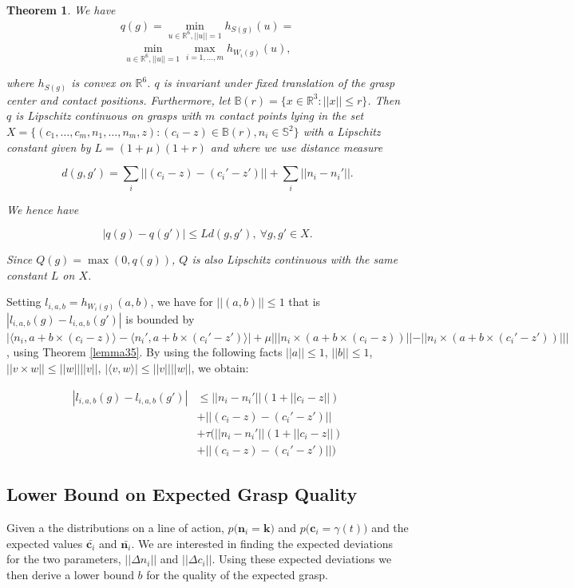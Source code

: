 \documentclass[letterpaper, 10 pt, conference]{ieeeconf}  %
\newtheorem{theorem}{Theorem}
\begin{document}
\begin{theorem}
  \cite{pokorny2013classical}
We have \\

\begin{align}
q(g) 
=
\min_{u\in \mathbb{R}^6, ||u|| =1} h_{S(g)}(u) 
=
\end{align}
\[
\min_{u\in \mathbb{R}^6, ||u|| =1} \max_{i=1,...,m} h_{W_i(g)}(u),
\]

where $h_{S(g)}$ is convex on $\mathbb{R}^6$.
$q$ is invariant under fixed translation of the grasp center and contact positions.
Furthermore, let $\mathbb{B}(r) = \lbrace x \in \mathbb{R}^3 : ||x|| \leq r \rbrace$.
Then $q$ is Lipschitz continuous on grasps with $m$ contact points lying in the set $X = \lbrace (c_1, \dots, c_m,n_1, \dots,n_m,z) : (c_i-z) \in \mathbb{B}(r), n_i \in \mathbb{S}^2 \rbrace$ with a Lipschitz constant given by $L= (1+\mu)(1+r)$ and where we use distance measure 

\[
  d(g,g') = \sum_i ||(c_i-z)-(c_i'-z')|| + \sum_i ||n_i - n_i'||.
\]

We hence have 

\[
|q(g) - q(g')| \leq Ld(g,g'),\  \forall g,g' \in X.
\]

Since $Q(g) = \max(0,q(g))$, $Q$ is also Lipschitz continuous with the same constant $L$ on $X$. 
\end{theorem}

Setting $l_{i,a,b} = h_{W_i(g)}(a,b)$, we have for $||(a,b)|| \leq 1$ that is $|l_{i,a,b}(g) - l_{i,a,b}(g')|$ is bounded by $|\langle n_i,a+b\times (c_i-z)\rangle - \langle n_i',a+b\times(c_i'-z')\rangle|+\mu|||n_i \times (a+b \times (c_i -z))|| - ||n_i \times (a + b \times (c_i' - z')) |||$, using Theorem \ref{lemma35}.
By using the following facts $||a|| \leq 1$, $||b|| \leq 1$, $||v \times w || \leq ||w||||v||$, $|\langle v,w\rangle | \leq ||v||||w||$, we obtain:  

\begin{align*}
|l_{i,a,b}(g) - l_{i,a,b}(g')| &\leq ||n_i - n_i'||(1+||c_i - z||) \\
					&+ ||(c_i - z)-(c_i'-z')|| \\
					&+ \tau(||n_i - n_i'||(1+||c_i - z||)\\
					&+||(c_i - z)-(c_i'-z')||)
\end{align*}

\subsection{Lower Bound on Expected Grasp Quality}
Given a the distributions on a line of action, $p\big(\textbf{n}_i = \textbf{k}\big)$ and $p\big(\textbf{c}_i=\gamma(t) \big)$ and the expected values $\bar{\textbf{c}_i}$ and $\bar{\textbf{n}_i}$. We are interested in finding the expected deviations for the two parameters, $||\Delta n_i||$ and  $||\Delta c_i||$. Using these expected deviations we then derive a lower bound $b$ for the quality of the expected grasp. 
\end{document}
